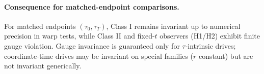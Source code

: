 \paragraph{Consequence for matched-endpoint comparisons.}
For matched endpoints $(\tau_0,\tau_T)$, Class I remains invariant up to numerical precision in warp tests, while Class II and fixed-$t$ observers (H1/H2) exhibit finite gauge violation.
Gauge invariance is guaranteed only for $\tau$-intrinsic drives; coordinate-time drives may be invariant on special families ($r$ constant) but are not invariant generically.
